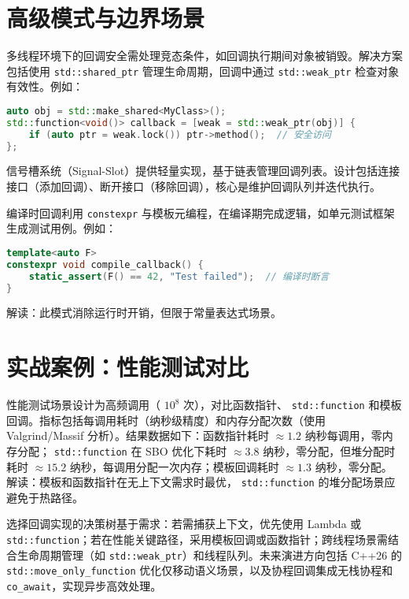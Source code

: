 \chapter{高级模式与边界场景}
多线程环境下的回调安全需处理竞态条件，如回调执行期间对象被销毁。解决方案包括使用 \texttt{std::shared\_{}ptr} 管理生命周期，回调中通过 \texttt{std::weak\_{}ptr} 检查对象有效性。例如：\par
\begin{lstlisting}[language=cpp]
auto obj = std::make_shared<MyClass>();  
std::function<void()> callback = [weak = std::weak_ptr(obj)] {  
    if (auto ptr = weak.lock()) ptr->method();  // 安全访问  
};  
\end{lstlisting}
信号槽系统（Signal-Slot）提供轻量实现，基于链表管理回调列表。设计包括连接接口（添加回调）、断开接口（移除回调），核心是维护回调队列并迭代执行。\par
编译时回调利用 \texttt{constexpr} 与模板元编程，在编译期完成逻辑，如单元测试框架生成测试用例。例如：\par
\begin{lstlisting}[language=cpp]
template<auto F>  
constexpr void compile_callback() {  
    static_assert(F() == 42, "Test failed");  // 编译时断言  
}  
\end{lstlisting}
解读：此模式消除运行时开销，但限于常量表达式场景。\par
\chapter{实战案例：性能测试对比}
性能测试场景设计为高频调用（ $10^8$ 次），对比函数指针、 \texttt{std::function} 和模板回调。指标包括每调用耗时（纳秒级精度）和内存分配次数（使用 Valgrind/Massif 分析）。结果数据如下：函数指针耗时 $\approx 1.2$ 纳秒每调用，零内存分配； \texttt{std::function} 在 SBO 优化下耗时 $\approx 3.8$ 纳秒，零分配，但堆分配时耗时 $\approx 15.2$ 纳秒，每调用分配一次内存；模板回调耗时 $\approx 1.3$ 纳秒，零分配。解读：模板和函数指针在无上下文需求时最优， \texttt{std::function} 的堆分配场景应避免于热路径。\par
选择回调实现的决策树基于需求：若需捕获上下文，优先使用 Lambda 或 \texttt{std::function}；若在性能关键路径，采用模板回调或函数指针；跨线程场景需结合生命周期管理（如 \texttt{std::weak\_{}ptr}）和线程队列。未来演进方向包括 C++26 的 \texttt{std::move\_{}only\_{}function} 优化仅移动语义场景，以及协程回调集成无栈协程和 \texttt{co\_{}await}，实现异步高效处理。\par
